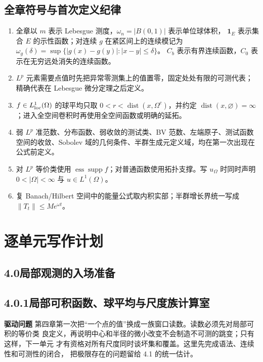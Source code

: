 \documentclass[11pt,a4paper]{ctexart}
\newcommand{\ess}{\operatorname*{ess}}
\newcommand{\supp}{\operatorname{supp}}
\newcommand{\dist}{\operatorname{dist}}
\newcommand{\planitem}[1]{\par\smallskip\noindent\textcolor{deepblue}{\textbf{#1}}\quad}
\newcommand{\unithead}[2]{\subsection{#1\quad #2}}
\begin{document}
\subsection{全章符号与首次定义纪律}

\begin{enumerate}
\item 全章以 $m$ 表示 Lebesgue 测度，$\omega_n=|B(0,1)|$ 表示单位球体积，
      $\mathbf1_E$ 表示集合 $E$ 的示性函数；对连续 $g$ 在紧区间上的连续模记为
      $\omega_g(\delta)=\sup\{|g(x)-g(y)|:|x-y|\le\delta\}$。
      $C_b$ 表示有界连续函数，$C_0$ 表示在无穷远处消失的连续函数。
\item $L^p$ 元素需要点值时先把异常零测集上的值置零，固定处处有限的可测代表；精确代表在 Lebesgue 微分定理之后定义。
\item $f\in L^1_{\rm loc}(\Omega)$ 的球平均只取 $0<r<\dist(x,\Omega^c)$，并约定
$\dist(x,\varnothing)=\infty$；进入全空间卷积时再使用全空间函数或明确的延拓。
\item 弱 $L^p$ 准范数、分布函数、弱收敛的测试类、BV 范数、左端原子、测试函数空间的收敛、Sobolev 域的几何条件、半群生成元定义域，均在第一次出现在公式前定义。
\item 对 $L^p$ 等价类使用 $\ess\supp f$；对普通函数使用拓扑支撑。写 $u_\Omega$ 时同时声明 $0<|\Omega|<\infty$ 与 $u\in L^1(\Omega)$。
\item 复 Banach/Hilbert 空间中的能量公式取内积实部；半群增长界统一写成 $\|T_t\|\le Me^{\omega t}$。
\end{enumerate}

\section{逐单元写作计划}

\subsection*{4.0\quad 局部观测的入场准备}

\unithead{4.0.1}{局部可积函数、球平均与尺度族计算室}

\planitem{驱动问题}
第四章第一次把“一个点的值”换成一族窗口读数。读数必须先对局部可积的等价类
良定义，再说明中心和半径的微小改变不会制造不可测的跳变；只有这样，下一单元
才有资格对所有尺度同时谈坏集和覆盖。这里先完成语法、连续性和可测性的闭合，
把极限存在的问题留给 4.1 的统一估计。
\end{document}
